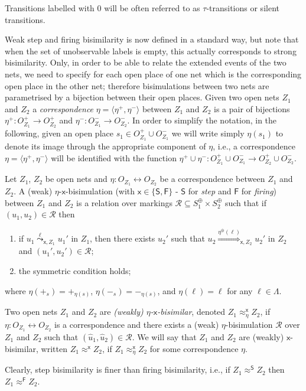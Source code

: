 \documentclass{LMCS}
\newcommand{\init}[1]{\hat{#1}}
\newcommand{\mon}[1]{\ensuremath{{#1}^\oplus}}
\newcommand{\monSub}[2]{\ensuremath{{#1}_{#2}^\oplus}}
\newcommand{\wltr}[3][x]{\ensuremath{\stackrel{{#3}}{\leadsto}_{\mathsf{#1},#2}}}
\newcommand{\Ltr}[3][x]{\ensuremath{\stackrel{{#3}}{\Longrightarrow}_{\mathsf{#1},#2}}}
\begin{document}
Transitions labelled with $0$ will be often referred to as
$\tau$-transitions or silent transitions.

Weak step and firing bisimilarity is now defined in a standard way,
but note that when the set of unobservable labels is empty, this
actually  corresponds to strong bisimilarity. 
Only, in order to be able to relate the extended events of the two
nets, we need to specify for each open place of one net which is the
corresponding open place in the other net; therefore bisimulations
between two nets are parametrised by a bijection between their open
places.
Given two open nets $Z_1$ and $Z_2$ a \emph{correspondence}
$\eta = \langle \eta^+, \eta^- \rangle$ between $Z_1$ and $Z_2$ is a
pair of bijections $\eta^+ : O_{Z_1}^+ \to O_{Z_2}^+$ and $\eta^- : O_{Z_1}^- \to
O_{Z_2}^-$. In order to simplify the notation, in the following, given an
open place $s_1 \in O_{Z_1}^+ \cup O_{Z_1}^-$ we will write simply $\eta(s_1)$
to denote its image through the appropriate component of $\eta$, i.e.,
a correspondence $\eta = \langle \eta^+, \eta^- \rangle$ will be
identified with the function $\eta^+ \cup \eta^- : O_{Z_1}^+ \cup O_{Z_1}^-
\to O_{Z_2}^+ \cup O_{Z_2}^-$.

\begin{defi}
  \label{de:weak-bisim}
  Let $Z_1$, $Z_2$ be open nets and $\eta : O_{Z_1} \leftrightarrow
  O_{Z_2}$ be a correspondence between $Z_1$ and $Z_2$.
A (weak) $\eta$-$\mathsf{x}$-bisimulation (with $\mathsf{x} \in \{
  \mathsf{S}, \mathsf{F} \}$ - $\mathsf{S}$ for \emph{step} and $\mathsf{F}$ for \emph{firing})
  between $Z_1$ and $Z_2$ is a relation over markings $\mathcal{R}
  \subseteq \monSub{S}{1} \times \monSub{S}{2}$ such that if $(u_1,
  u_2) \in \mathcal{R}$ then

  \begin{enumerate}[$\bullet$]


  \item if $u_1 \wltr{Z_1}{\ell} u_1'$ in $Z_1$, then there exists
    $u_2'$ such that $u_2 \Ltr{Z_2}{\mon{\eta}(\ell)} u_2'$ in
    $Z_2$ and $(u_1', u_2') \in \mathcal{R}$;

  \item the symmetric condition holds;

  \end{enumerate}
  where $\eta(+_s) = +_{\eta(s)}$, $\eta(-_s) = -_{\eta(s)}$, and
  $\eta(\ell) = \ell$ for any $\ell \in \Lambda$.

  Two open nets $Z_1$ and $Z_2$ are \emph{(weakly)
    $\eta$-$\mathsf{x}$-bisimilar}, denoted $Z_1 \approx_\eta^\mathsf{x} Z_2$, if
  $\eta : O_{Z_1} \leftrightarrow O_{Z_2}$ is a correspondence and there
  exists a (weak) $\eta$-bisimulation $\mathcal{R}$ over $Z_1$ and
  $Z_2$ such that $(\init{u}_1,\init{u}_2) \in \mathcal{R}$.  We will
  say that $Z_1$ and $Z_2$ are (weakly) $\mathsf{x}$-bisimilar,
  written $Z_1 \approx^\mathsf{x} Z_2$, if $Z_1
  \approx_\eta^\mathsf{x} Z_2$ for some correspondence $\eta$.
\end{defi}
Clearly, step bisimilarity is finer than firing bisimilarity, i.e., if $Z_1 \approx^{\mathsf{S}} Z_2$ then $Z_1 \approx^{\mathsf{F}} Z_2$.
\end{document}
